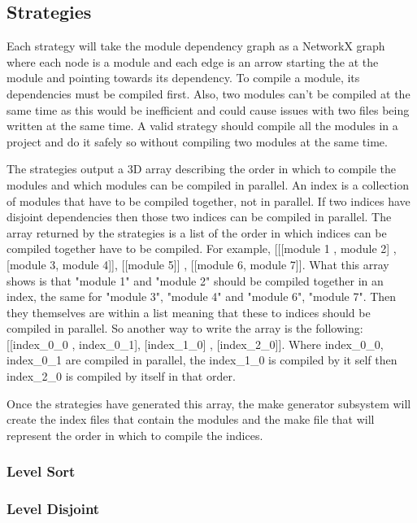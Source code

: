 \subsection{Strategies}

Each strategy will take the module dependency graph as a NetworkX graph where
each node is a module and each edge is an arrow starting the at the module and
pointing towards its dependency. To compile a module, its dependencies must be
compiled first. Also, two modules can't be compiled at the same time as this
would be inefficient and could cause issues with two files being written at the
same time. A valid strategy should compile all the modules in a project and do
it safely so without compiling two modules at the same time. 

The strategies output a 3D array describing the order in which to compile the
modules and which modules can be compiled in parallel. An index is a collection
of modules that have to be compiled together, not in parallel. If two indices
have disjoint dependencies then those two indices can be compiled in parallel.
The array returned by the strategies is a list of the order in which indices
can be compiled together have to be compiled. For example, [[[module 1 , module
2] , [module 3, module 4]], [[module 5]] , [[module 6, module 7]]. What this
array shows is that "module 1" and "module 2" should be compiled together in an
index, the same for "module 3", "module 4" and "module 6", "module 7". Then
they themselves are within a list meaning that these to indices should be
compiled in parallel. So another way to write the array is the following:
[[index\_0\_0 , index\_0\_1], [index\_1\_0] , [index\_2\_0]]. Where index\_0\_0,
index\_0\_1 are compiled in parallel, the index\_1\_0 is compiled by it self then
index\_2\_0 is compiled by itself in that order.

Once the strategies have generated this array, the make generator
subsystem will create the index files that contain the modules and the make
file that will represent the order in which to compile the indices.

\subsubsection{Level Sort}

\subsubsection{Level Disjoint}

